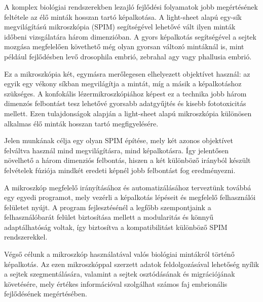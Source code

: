 \documentclass{diploma_style}
\begin{document}
\begin{absztrakt}
A komplex biológiai rendszerekben lezajló fejlődési folyamatok jobb meg\-ér\-té\-sé\-nek feltétele az élő minták hosszan tartó képalkotása. A light-sheet alapú egy-sík megvilágítású mikroszkópia (SPIM) segítségével lehetővé vált ilyen minták időbeni vizsgálatára három dimenzióban. A gyors képalkotás segítségével a sejtek mozgása megfelelően követhető még olyan gyorsan változó mintáknál is, mint például fejlődésben levő dro\-so\-phi\-la embrió, zebrahal agy vagy phallusia embrió.

Ez a mikroszkópia két, egymásra merőlegesen elhelyezett objektívet használ: az egyik egy vékony síkban megvilágítja a mintát, míg a másik a képalkotáshoz szükséges. A konfokális lézermikroszkópiához képest ez a technika jobb három dimenzós felbontást tesz lehetővé gyorsabb adatgyűjtés és kisebb fototoxicitás mellett. Ezen tulajdonságok alapján a light-sheet alapú mikroszkópia különösen alkalmas élő minták hosszan tartó megfigyelésére.

Jelen munkának célja egy olyan SPIM építése, mely két azonos objektívet felváltva használ mind megvilágításra, mind képalkotásra. Így jelentősen növelhető a három dimenziós felbontás, hiszen a két különböző irányból készült felvételek fúziója mindkét eredeti képnél jobb felbontást fog eredményezni.

A mikroszkóp megfelelő irányításához és automatizálásához terveztünk to\-váb\-bá egy egyedi programot, mely vezérli a képalkotás lépéseit és megfelelő felhasználói felületet nyújt. A program fejlesztésénél a legfőbb szempontjaink a felhasználóbarát felület biztosítása mellett a modularitás és könnyű a\-dap\-tál\-ha\-tó\-ság voltak, így biztosítva a kompatibilitást különböző SPIM rendszerekkel.

Végső célunk a mikroszkóp használatával valós biológiai mintákról tör\-té\-nő képalkotás. Az ezen mikroszkóppal szerzett adatok feldolgozásával le\-he\-tő\-ség nyílik a sejtek szegmentálására, valamint a sejtek osztódásának és mig\-rá\-ci\-ó\-já\-nak követésére, mely értékes információval szolgálhat szá\-mos faj embrionális fejlődésének megértésében.
\end{absztrakt}
\end{document}
